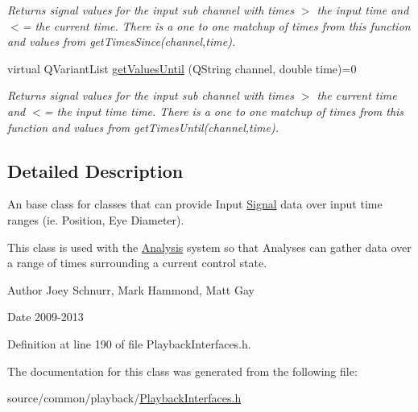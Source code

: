 \begin{DoxyCompactItemize}
\begin{DoxyCompactList}\small\item\em Returns signal values for the input sub channel with times $>$ the input time and $<$= the current time. There is a one to one matchup of times from this function and values from get\-Times\-Since(channel,time). \end{DoxyCompactList}\item 
\hypertarget{class_picto_1_1_signal_reader_abc299eb90960d503b96ba5f94779a0d8}{virtual Q\-Variant\-List \hyperlink{class_picto_1_1_signal_reader_abc299eb90960d503b96ba5f94779a0d8}{get\-Values\-Until} (Q\-String channel, double time)=0}\label{class_picto_1_1_signal_reader_abc299eb90960d503b96ba5f94779a0d8}

\begin{DoxyCompactList}\small\item\em Returns signal values for the input sub channel with times $>$ the current time and $<$= the input time time. There is a one to one matchup of times from this function and values from get\-Times\-Until(channel,time). \end{DoxyCompactList}\end{DoxyCompactItemize}


\subsection{Detailed Description}
An base class for classes that can provide Input \hyperlink{class_picto_1_1_signal}{Signal} data over input time ranges (ie. Position, Eye Diameter). 

This class is used with the \hyperlink{class_picto_1_1_analysis}{Analysis} system so that Analyses can gather data over a range of times surrounding a current control state. \begin{DoxyAuthor}{Author}
Joey Schnurr, Mark Hammond, Matt Gay 
\end{DoxyAuthor}
\begin{DoxyDate}{Date}
2009-\/2013 
\end{DoxyDate}


Definition at line 190 of file Playback\-Interfaces.\-h.



The documentation for this class was generated from the following file\-:\begin{DoxyCompactItemize}
\item 
source/common/playback/\hyperlink{_playback_interfaces_8h}{Playback\-Interfaces.\-h}\end{DoxyCompactItemize}
